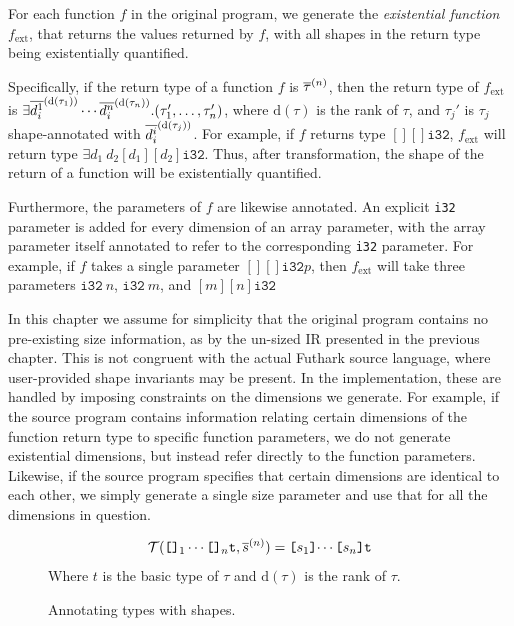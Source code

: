 \newcommand{\ext}{\textrm{ext}}
\newcommand{\shape}{\textrm{shape}}
\newcommand{\val}{\textrm{value}}
\newcommand{\checking}{\textrm{checking}}

For each function $f$ in the original program, we generate the
\textit{existential function} $f_{\ext}$, that returns the values
returned by $f$, with all shapes in the return type being
existentially quantified.

Specifically, if the return type of a function \(f\) is
$\overline{\tau}^{(n)}$, then the return type of \(f_{\ext}\) is
\(\exists\overline{d^{1}_{i}}^{(\text{d}(\tau_{1}))}\cdots\overline{d^{n}_{i}}^{(\text{d}(\tau_{n}))}.(\tau_{1}',
\ldots, \tau_{n}')\), where $\text{d}(\tau)$ is the rank of $\tau$,
and \(\tau_{j}'\) is \(\tau_{j}\) shape-annotated with
\(\overline{d^{i}_{i}}^{(\text{d}(\tau_{j}))}\).
%
For example, if \(f\) returns type \([][]\texttt{i32}\), \(f_{\ext}\)
will return type \(\exists d_{1}~d_{2}[d_{1}][d_{2}]\texttt{i32}\).
Thus, after transformation, the shape of the return of a function will
be existentially quantified.

Furthermore, the parameters of \(f\) are likewise annotated.  An
explicit \texttt{i32} parameter is added for every dimension of an
array parameter, with the array parameter itself annotated to refer to
the corresponding \texttt{i32} parameter.  For example, if \(f\) takes
a single parameter \([][]\texttt{i32} p\), then \(f_{\ext}\) will take
three parameters \(\texttt{i32}~n\), \(\texttt{i32}~m\), and
\([m][n]\texttt{i32}\)

In this chapter we assume for simplicity that the original program
contains no pre-existing size information, as by the un-sized IR
presented in the previous chapter.  This is not congruent with the
actual Futhark source language, where user-provided shape invariants
may be present.  In the implementation, these are handled by imposing
constraints on the dimensions we generate.  For example, if the source
program contains information relating certain dimensions of the
function return type to specific function parameters, we do not
generate existential dimensions, but instead refer directly to the
function parameters.  Likewise, if the source program specifies that
certain dimensions are identical to each other, we simply generate a
single size parameter and use that for all the dimensions in question.

\begin{figure}[bt]

\begin{align*}
  \mathcal{T}(\texttt{[]}_{1}\cdots\texttt{[]}_n\texttt{t},\overline{s}^{(n)}) = \texttt{[$s_{1}$]$\cdots$[$s_{n}$]\texttt{t}}
\end{align*}%
\hfill Where $t$ is the basic type of $\tau$ and $\text{d}(\tau)$ is
the rank of $\tau$.
\caption{Annotating types with shapes.}
\label{fig:annotating bindings}
\end{figure}

